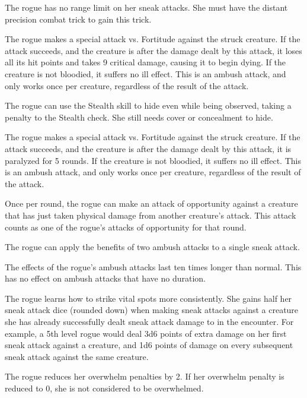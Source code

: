  The rogue has no range limit on her sneak attacks. She must have the distant precision combat trick to gain this trick.

 The rogue makes a special attack vs. Fortitude against the struck creature. If the attack succeeds, and the creature is \bloodied after the damage dealt by this attack, it loses all its hit points and takes 9 critical damage, causing it to begin dying. If the creature is not bloodied, it suffers no ill effect. This is an ambush attack, and only works once per creature, regardless of the result of the attack.

 The rogue can use the Stealth skill to hide even while being observed, taking a  penalty to the Stealth check. She still needs cover or concealment to hide.

 The rogue makes a special attack vs. Fortitude against the struck creature. If the attack succeeds, and the creature is \bloodied after the damage dealt by this attack, it is paralyzed for 5 rounds. If the creature is not bloodied, it suffers no ill effect. This is an ambush attack, and only works once per creature, regardless of the result of the attack.

 Once per round, the rogue can make an attack of opportunity against a creature that has just taken physical damage from another creature's attack. This attack counts as one of the rogue's attacks of opportunity for that round.

 The rogue can apply the benefits of two ambush attacks to a single sneak attack.

 The effects of the rogue's ambush attacks last ten times longer than normal. This has no effect on ambush attacks that have no duration.

 The rogue learns how to strike vital spots more consistently. She gains half her sneak attack dice (rounded down) when making sneak attacks against a creature she has already successfully dealt sneak attack damage to in the encounter. For example, a 5th level rogue would deal 3d6 points of extra damage on her first sneak attack against a creature, and 1d6 points of damage on every subsequent sneak attack against the same creature.

  The rogue reduces her overwhelm penalties by 2. If her overwhelm penalty is reduced to 0, she is not considered to be overwhelmed.

